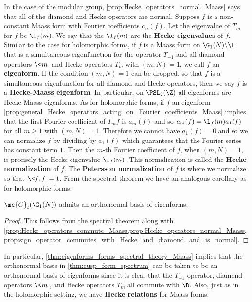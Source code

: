     In the case of the modular group, \cref{prop:Hecke_operators_normal_Maass} says that all of the diamond and Hecke operators are normal. Suppose $f$ is a non-constant Maass form with Fourier coefficients $a_{n}(f)$. Let the eigenvalue of $T_{m}$ for $f$ be $\l_{f}(m)$. We say that the $\l_{f}(m)$ are the \textbf{Hecke eigenvalues} of $f$. Similar to the case for holomorphic forms, if $f$ is a Maass form on $\G_{1}(N)\backslash\H$ that is a simultaneous eigenfunction for the operator $T_{-1}$ and all diamond operators $\<m\>$ and Hecke operators $T_{m}$ with $(m,N) = 1$, we call $f$ an \textbf{eigenform}. If the condition $(m,N) = 1$ can be dropped, so that $f$ is a simultaneous eigenfunction for all diamond and Hecke operators, then we say $f$ is a \textbf{Hecke-Maass eigenform}. In particular, on $\PSL_{2}(\Z)$ all eigenforms are Hecke-Maass eigenforms. As for holomorphic forms, if $f$ an eigenform \cref{prop:general_Hecke_operators_acting_on_Fourier_coefficients_Maass} implies that the first Fourier coefficient of $T_{m}f$ is $a_{m}(f)$ and so $a_{m}(f) = \l_{f}(m)a_{1}(f)$ for all $m \ge 1$ with $(m,N) = 1$. Therefore we cannot have $a_{1}(f) = 0$ and so we can normalize $f$ by dividing by $a_{1}(f)$ which guarantees that the Fourier series has constant term $1$. Then the $m$-th Fourier coefficient of $f$, when $(m,N) = 1$, is precisely the Hecke eigenvalue $\l_{f}(m)$. This normalization is called the \textbf{Hecke normalization} of $f$. The \textbf{Petersson normalization} of $f$ is where we normalize so that $\<f,f\> = 1$. From the spectral theorem we have an analogous corollary as for holomorphic forms:

    \begin{theorem}\label{thm:eigenforms_forms_spectral_theory_Maass}
      $\mc{C}_{t}(\G_{1}(N))$ admits an orthonormal basis of eigenforms.
    \end{theorem}
    \begin{proof}
      This follows from the spectral theorem along with \cref{prop:Hecke_operators_commute_Maass,prop:Hecke_operators_normal_Maass,prop:sign_operator_commutes_with_Hecke_and_diamond_and_is_normal}.
    \end{proof}

    In particular, \cref{thm:eigenforms_forms_spectral_theory_Maass} implies that the orthonormal basis in \cref{thm:cusp_form_spectrum} can be taken to be an orthonormal basis of eigenforms since it is clear that the $T_{-1}$ operator, diamond operators $\<m\>$, and Hecke operators $T_{m}$ all commute with $\D$. Also, just as in the holomorphic setting, we have \textbf{Hecke relations} for Maass forms:

